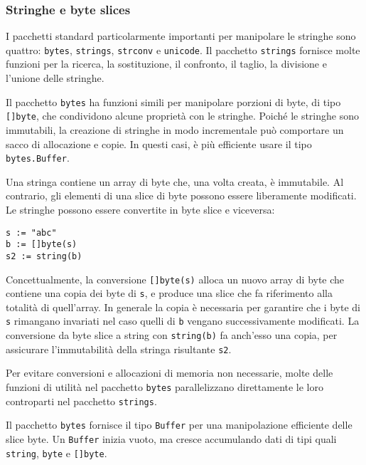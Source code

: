 \documentclass[../../../thesis.tex]{subfiles}
\begin{document}
    \subsubsection{Stringhe e byte slices}
    I pacchetti standard particolarmente importanti per manipolare le stringhe sono quattro: \verb"bytes", \verb"strings", \verb"strconv" e \verb"unicode".
    Il pacchetto \verb"strings" fornisce molte funzioni per la ricerca, la sostituzione, il confronto, il taglio, la divisione e l'unione delle stringhe.
    \hfill \vspace{12pt}

    Il pacchetto \verb"bytes" ha funzioni simili per manipolare porzioni di byte, di tipo \verb"[]byte", che condividono alcune proprietà con le stringhe.
    Poiché le stringhe sono immutabili, la creazione di stringhe in modo incrementale può comportare un sacco di allocazione e copie.
    In questi casi, è più efficiente usare il tipo \verb"bytes.Buffer".
    \hfill \vspace{12pt}

    Una stringa contiene un array di byte che, una volta creata, è immutabile.
    Al contrario, gli elementi di una slice di byte possono essere liberamente modificati.
    Le stringhe possono essere convertite in byte slice e viceversa:
    \begin{lstlisting}[frame = single, label = {lst:lstlisting2-2-4.1}]
s := "abc"
b := []byte(s)
s2 := string(b)
    \end{lstlisting}
    Concettualmente, la conversione \verb"[]byte(s)" alloca un nuovo array di byte che contiene una copia dei byte di \verb"s", e produce una slice che fa riferimento alla totalità di quell'array.
    In generale la copia è necessaria per garantire che i byte di \verb"s" rimangano invariati nel caso quelli di \verb"b" vengano successivamente modificati.
    La conversione da byte slice a string con \verb"string(b)" fa anch'esso una copia, per assicurare l'immutabilità della stringa risultante \verb"s2".
    \hfill \vspace{12pt}

    Per evitare conversioni e allocazioni di memoria non necessarie, molte delle funzioni di utilità nel pacchetto \verb"bytes" parallelizzano direttamente le loro controparti nel pacchetto \verb"strings".
    \hfill \vspace{12pt}

    Il pacchetto \verb"bytes" fornisce il tipo \verb"Buffer" per una manipolazione efficiente delle slice byte.
    Un \verb"Buffer" inizia vuoto, ma cresce accumulando dati di tipi quali \verb"string", \verb"byte" e \verb"[]byte".
\end{document}
